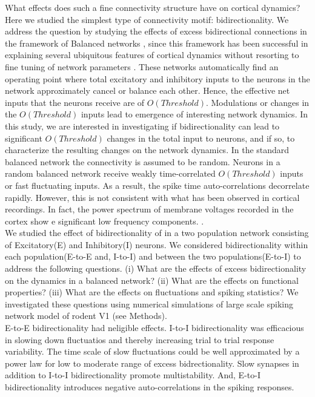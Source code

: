 What effects does such a fine connectivity structure have on cortical dynamics? Here we studied the simplest type of connectivity motif: bidirectionality. We address the question by studying the effects of excess bidirectional connections in the framework of Balanced networks \cite{carl1996, carl1998, carl2004}, since this framework has been successful in explaining several ubiquitous features of cortical dynamics without resorting to fine tuning of network parameters \cite{softky1993, Holt1996, roxin2011}. These networks automatically find an operating point where total excitatory and inhibitory inputs to the neurons in the network approximately cancel or balance each other.  Hence, the effective net inputs that the neurons receive are of $O(Threshold)$. Modulations or changes in the $O(Threshold)$ inputs lead to emergence of interesting network dynamics. In this study, we are interested in investigating if bidirectionality can lead to significant $O(Threshold)$ changes in the total input to neurons, and if so, to characterize the resulting changes on the network dynamics. In the standard balanced network the connectivity is assumed to be random. Neurons in a random balanced network receive weakly time-correlated $O(Threshold)$ inputs or fast fluctuating inputs. As a result, the spike time auto-correlations decorrelate rapidly\cite{carl1996, carl1998}. However, this is not consistent with what has been observed in cortical recordings. In fact, the power spectrum of membrane voltages recorded in the cortex show e significant low frequency components. \cite{Tan2014}.\\	
	
We studied the effect of bidirectionality of in a two population network consisting of Excitatory(E) and Inhibitory(I) neurons. We considered bidirectionality within each population(E-to-E and, I-to-I) and between the two populations(E-to-I) to address the following questions. (i) What are the effects of excess bidirectionality on the dynamics in a balanced network? (ii) What are the effects on functional properties? (iii) What are the effects on fluctuations and spiking statistics?
We investigated these questions using numerical simulations of large scale spiking network  model of rodent V1 (see Methods). \\
 
 E-to-E bidirectionality had neligible effects. I-to-I bidirectionality was efficacious in slowing down fluctuatios and thereby increasing trial to trial response variability. The time scale of slow fluctuations could be well approximated by a power law for low to moderate range of excess bidrectionality. Slow synapses in addition to I-to-I bidirectionality promote multistability. And, E-to-I bidirectionality introduces negative auto-correlations in the spiking responses. 

